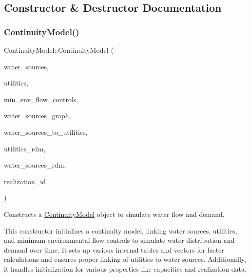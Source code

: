 \subsection{Constructor \& Destructor Documentation}
\mbox{\label{classContinuityModel_acadf595deb924bc08c9b702adf223365}} 
\subsubsection{\texorpdfstring{Continuity\+Model()}{ContinuityModel()}\hspace{0.1cm}{\footnotesize\ttfamily [1/2]}}
{\footnotesize\ttfamily Continuity\+Model\+::\+Continuity\+Model (\begin{DoxyParamCaption}\item[{vector$<$ \mbox{\hyperlink{classWaterSource}{Water\+Source}} $\ast$$>$ \&}]{water\+\_\+sources,  }\item[{vector$<$ \mbox{\hyperlink{classUtility}{Utility}} $\ast$$>$ \&}]{utilities,  }\item[{vector$<$ Min\+Env\+Flow\+Control $\ast$$>$ \&}]{min\+\_\+env\+\_\+flow\+\_\+controls,  }\item[{const Graph \&}]{water\+\_\+sources\+\_\+graph,  }\item[{const vector$<$ vector$<$ int $>$$>$ \&}]{water\+\_\+sources\+\_\+to\+\_\+utilities,  }\item[{vector$<$ double $>$ \&}]{utilities\+\_\+rdm,  }\item[{vector$<$ double $>$ \&}]{water\+\_\+sources\+\_\+rdm,  }\item[{unsigned long}]{realization\+\_\+id }\end{DoxyParamCaption})}



Constructs a \mbox{\hyperlink{classContinuityModel}{Continuity\+Model}} object to simulate water flow and demand. 

This constructor initializes a continuity model, linking water sources, utilities, and minimum environmental flow controls to simulate water distribution and demand over time. It sets up various internal tables and vectors for faster calculations and ensures proper linking of utilities to water sources. Additionally, it handles initialization for various properties like capacities and realization data.


